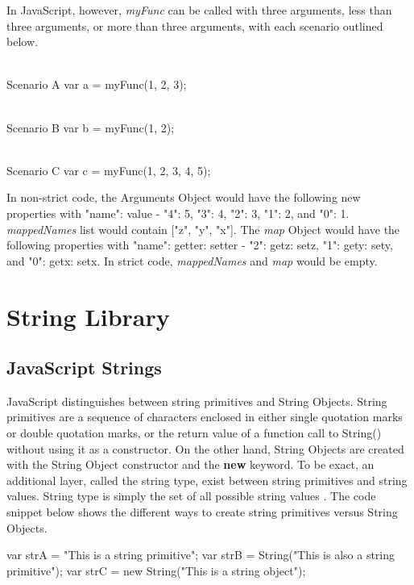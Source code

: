 \documentclass[a4paper,11pt,twoside]{report}
\begin{document}
In JavaScript, however, \textit{myFunc} can be called with three arguments, less than three arguments, or more than three arguments, with each scenario outlined below.
\begin{adjustwidth}{4cm}{4cm}
\begin{lstjs}
\\ Scenario A
var a = myFunc(1, 2, 3);

\\ Scenario B
var b = myFunc(1, 2);

\\ Scenario C
var c = myFunc(1, 2, 3, 4, 5);
\end{lstjs}
\end{adjustwidth}
In non-strict code, the Arguments Object would have the following new properties with "name": value - "4": 5, "3": 4, "2": 3, "1": 2, and "0": 1. \textit{mappedNames} list would contain ["z", "y", "x"]. The \textit{map} Object would have the following properties with "name": getter: setter - "2": getz: setz, "1": gety: sety, and "0": getx: setx. In strict code, \textit{mappedNames} and \textit{map} would be empty.

\chapter{String Library}
\section{JavaScript Strings}
JavaScript distinguishes between string primitives and String Objects. String primitives are a sequence of characters enclosed in either single quotation marks or double quotation marks, or the return value of a function call to String() without using it as a constructor. On the other hand, String Objects are created with the String Object constructor and the \textbf{new} keyword. To be exact, an additional layer, called the string type, exist between string primitives and string values. String type is simply the set of all possible string values \cite{EcmaScript}. The code snippet below shows the different ways to create string primitives versus String Objects.
\begin{adjustwidth}{4cm}{4cm}
\begin{lstjs}
var strA = "This is a string primitive";
var strB = String("This is also a string primitive");
var strC = new String("This is a string object");
\end{lstjs}
\end{adjustwidth}
\end{document}
